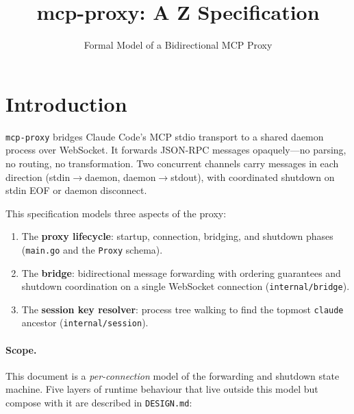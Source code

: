 \documentclass[a4paper,10pt,fleqn]{article}
\begin{document}
\title{mcp-proxy: A Z Specification}
\author{Formal Model of a Bidirectional MCP Proxy}
\date{}
\maketitle

\tableofcontents
\newpage

\section{Introduction}

\texttt{mcp-proxy} bridges Claude Code's MCP stdio transport to a shared
daemon process over WebSocket.  It forwards JSON-RPC messages opaquely---no
parsing, no routing, no transformation.  Two concurrent channels carry
messages in each direction (stdin$\to$daemon, daemon$\to$stdout), with
coordinated shutdown on stdin EOF or daemon disconnect.

This specification models three aspects of the proxy:

\begin{enumerate}
  \item The \textbf{proxy lifecycle}: startup, connection, bridging, and
    shutdown phases (\texttt{main.go} and the \texttt{Proxy} schema).
  \item The \textbf{bridge}: bidirectional message forwarding with ordering
    guarantees and shutdown coordination on a single WebSocket connection
    (\texttt{internal/bridge}).
  \item The \textbf{session key resolver}: process tree walking to find the
    topmost \texttt{claude} ancestor (\texttt{internal/session}).
\end{enumerate}

\paragraph{Scope.}  This document is a \emph{per-connection} model of the
forwarding and shutdown state machine.  Five layers of runtime behaviour
that live outside this model but compose with it are described in
\texttt{DESIGN.md}:
\end{document}
